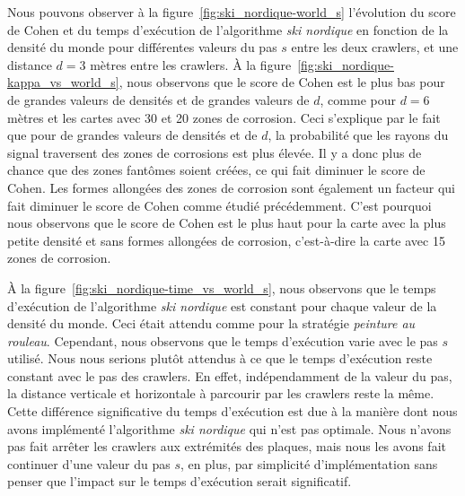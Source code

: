 \documentclass[francais,RandD]{rapportPFE}
\begin{document}
			Nous pouvons observer à la figure~\ref{fig:ski_nordique-world_s} l'évolution du score de Cohen et du temps d'exécution de l'algorithme \textit{ski nordique} en fonction de la densité du monde pour différentes valeurs du pas $s$ entre les deux crawlers, et une distance $d = 3$ mètres entre les crawlers.
			À la figure~\ref{fig:ski_nordique-kappa_vs_world_s}, nous observons que le score de Cohen est le plus bas pour de grandes valeurs de densités et de grandes valeurs de $d$, comme pour $d = 6$ mètres et les cartes avec 30 et 20 zones de corrosion.
			Ceci s'explique par le fait que pour de grandes valeurs de densités et de $d$, la probabilité que les rayons du signal traversent des zones de corrosions est plus élevée.
			Il y a donc plus de chance que des zones fantômes soient créées, ce qui fait diminuer le score de Cohen.
			Les formes allongées des zones de corrosion sont également un facteur qui fait diminuer le score de Cohen comme étudié précédemment.
			C'est pourquoi nous observons que le score de Cohen est le plus haut pour la carte avec la plus petite densité et sans formes allongées de corrosion, c'est-à-dire la carte avec 15 zones de corrosion.

			À la figure~\ref{fig:ski_nordique-time_vs_world_s}, nous observons que le temps d'exécution de l'algorithme \textit{ski nordique} est constant pour chaque valeur de la densité du monde.
			Ceci était attendu comme pour la stratégie \textit{peinture au rouleau}.
			Cependant, nous observons que le temps d'exécution varie avec le pas $s$ utilisé.
			Nous nous serions plutôt attendus à ce que le temps d'exécution reste constant avec le pas des crawlers.
			En effet, indépendamment de la valeur du pas, la distance verticale et horizontale à parcourir par les crawlers reste la même.
			Cette différence significative du temps d'exécution est due à la manière dont nous avons implémenté l'algorithme \textit{ski nordique} qui n'est pas optimale.
			Nous n'avons pas fait arrêter les crawlers aux extrémités des plaques, mais nous les avons fait continuer d'une valeur du pas $s$, en plus, par simplicité d'implémentation sans penser que l'impact sur le temps d'exécution serait significatif.
\end{document}
